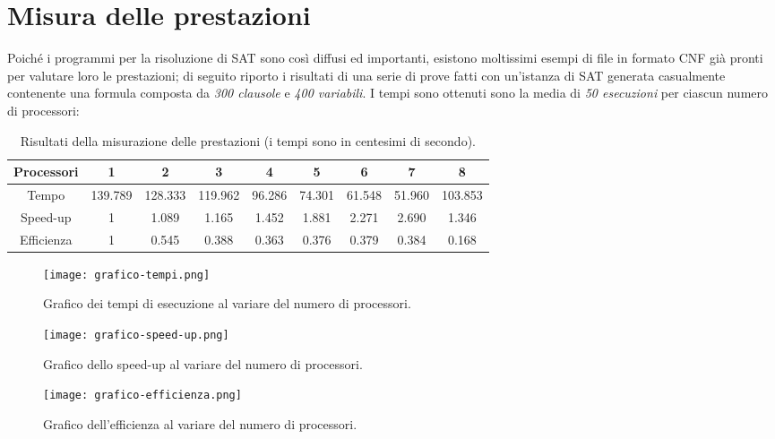 \documentclass[12pt, a4paper, twosides]{report}
\begin{document}
\section{Misura delle prestazioni}

Poiché i programmi per la risoluzione di SAT sono così diffusi ed importanti, esistono moltissimi esempi di file in formato CNF già pronti per valutare loro le prestazioni; di seguito riporto i risultati di una serie di prove fatti con un'istanza di SAT generata casualmente contenente una formula composta da \textit{300 clausole} e \textit{400 variabili}. I tempi sono ottenuti sono la media di \textit{50 esecuzioni} per ciascun numero di processori:

\begin{table}[ht]
\begin{center}
\begin{tabular}{ | c | c | c | c | c | c | c | c | c | }
\hline
Processori & 1 & 2 & 3 & 4 & 5 & 6 & 7 & 8 \\ \hline
Tempo & 139.789 & 128.333 & 119.962 & 96.286 & 74.301 & 61.548 & 51.960 & 103.853 \\ \hline
Speed-up & 1 & 1.089 & 1.165 & 1.452 & 1.881 & 2.271 & 2.690 & 1.346 \\ \hline
Efficienza & 1 & 0.545 & 0.388 & 0.363 & 0.376 & 0.379 & 0.384 & 0.168 \\ \hline
\end{tabular}
\end{center}
\caption{Risultati della misurazione delle prestazioni (i tempi sono in centesimi di secondo).}
\end{table}

\begin{figure}[ht]
\begin{center}
\texttt{[image: grafico-tempi.png]}
\end{center}
\caption{Grafico dei tempi di esecuzione al variare del numero di processori.}
\end{figure}

\begin{figure}[ht]
\begin{center}
\texttt{[image: grafico-speed-up.png]}
\end{center}
\caption{Grafico dello speed-up al variare del numero di processori.}
\end{figure}

\begin{figure}[ht]
\begin{center}
\texttt{[image: grafico-efficienza.png]}
\end{center}
\caption{Grafico dell'efficienza al variare del numero di processori.}
\end{figure}
\end{document}
